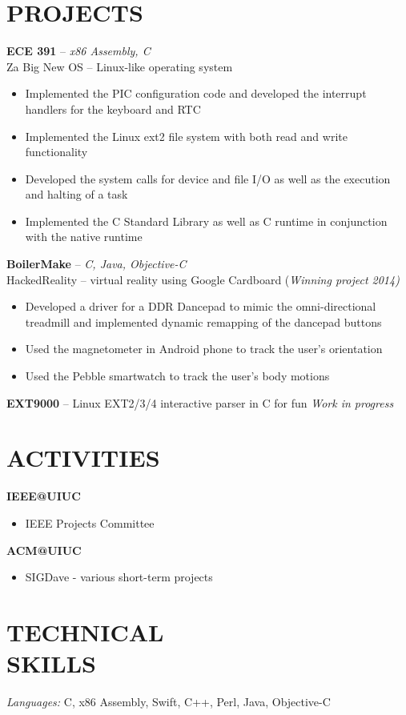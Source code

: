 \documentclass[resmargin]{res}
\begin{document}
\begin{resume}
\section{PROJECTS} 
{\bf ECE 391} -- {\sl x86 Assembly, C} \\ 
\textnormal {Za Big New OS -- Linux-like operating system} 
\begin{itemize} \itemsep -2pt
\vspace {.5mm}
\item Implemented the PIC configuration code and developed the interrupt handlers for the keyboard and RTC
\item Implemented the Linux ext2 file system with both read and write functionality
\item Developed the system calls for device and file I/O as well as the execution and halting of a task
\item Implemented the C Standard Library as well as C runtime in conjunction with the native runtime 
\end{itemize}
\vspace{-3mm}
{\bf BoilerMake} -- {\sl C, Java, Objective-C} \\
\textnormal {HackedReality -- virtual reality using Google Cardboard} (\sl {Winning project 2014})
\begin{itemize} \itemsep -2pt
\item Developed a driver for a DDR Dancepad to mimic the omni-directional treadmill and implemented dynamic remapping of the dancepad buttons
\item Used the magnetometer in Android phone to track the user's orientation
\item Used the Pebble smartwatch to track the user's body motions
\end{itemize}
\vspace{-3mm}
{\bf EXT9000} -- Linux EXT2/3/4 interactive parser in C for fun \hfill {\sl Work in progress} 

\vspace{-4mm}
\section {ACTIVITIES}

{\bf IEEE@UIUC}
\begin{itemize} \itemsep -2pt 
 \item IEEE Projects Committee
\end{itemize}

\vspace{-3mm}
{\bf ACM@UIUC}
\begin{itemize} \itemsep -2pt
 \item SIGDave - various short-term projects
\end{itemize} 

\vspace{-3mm}
\section{TECHNICAL \\ SKILLS} {\sl Languages:} C, x86 Assembly, Swift, C++, Perl, Java, Objective-C

\end{resume}
\end{document}
